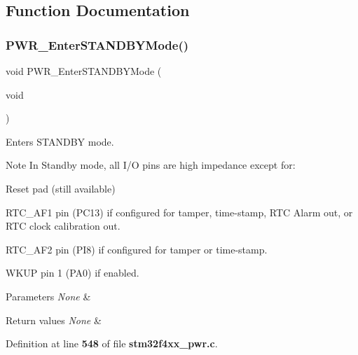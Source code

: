 \subsection{Function Documentation}
\mbox{\label{group__PWR__Group6_ga00ddae00a9c327b81b24d2597b0052f3}} 
\subsubsection{P\+W\+R\+\_\+\+Enter\+S\+T\+A\+N\+D\+B\+Y\+Mode()}
{\footnotesize\ttfamily void P\+W\+R\+\_\+\+Enter\+S\+T\+A\+N\+D\+B\+Y\+Mode (\begin{DoxyParamCaption}\item[{void}]{ }\end{DoxyParamCaption})}



Enters S\+T\+A\+N\+D\+BY mode. 

\begin{DoxyNote}{Note}
In Standby mode, all I/O pins are high impedance except for\+:
\begin{DoxyItemize}
\item Reset pad (still available)
\item R\+T\+C\+\_\+\+A\+F1 pin (P\+C13) if configured for tamper, time-\/stamp, R\+TC Alarm out, or R\+TC clock calibration out.
\item R\+T\+C\+\_\+\+A\+F2 pin (P\+I8) if configured for tamper or time-\/stamp.
\item W\+K\+UP pin 1 (P\+A0) if enabled. 
\end{DoxyItemize}
\end{DoxyNote}

\begin{DoxyParams}{Parameters}
{\em None} & \\
\hline
\end{DoxyParams}

\begin{DoxyRetVals}{Return values}
{\em None} & \\
\hline
\end{DoxyRetVals}


Definition at line \textbf{ 548} of file \textbf{ stm32f4xx\+\_\+pwr.\+c}.



